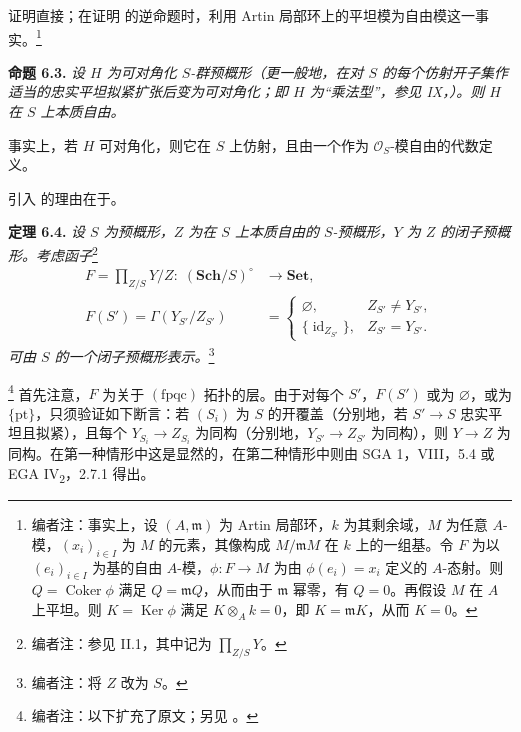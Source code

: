 证明直接；在证明  的逆命题时，利用 Artin 局部环上的平坦模为自由模这一事实。\footnote{编者注：事实上，设 \((A,\mathfrak m)\) 为 Artin 局部环，\(k\) 为其剩余域，\(M\) 为任意 \(A\)-模，\((x_i)_{i\in I}\) 为 \(M\) 的元素，其像构成 \(M/\mathfrak mM\) 在 \(k\) 上的一组基。令 \(F\) 为以 \((e_i)_{i\in I}\) 为基的自由 \(A\)-模，\(\phi:F\to M\) 为由 \(\phi(e_i)=x_i\) 定义的 \(A\)-态射。则 \(Q=\operatorname{Coker}\phi\) 满足 \(Q=\mathfrak mQ\)，从而由于 \(\mathfrak m\) 幂零，有 \(Q=0\)。再假设 \(M\) 在 \(A\) 上平坦。则 \(K=\operatorname{Ker}\phi\) 满足 \(K\otimes_Ak=0\)，即 \(K=\mathfrak mK\)，从而 \(K=0\)。}

\medskip
\noindent{}\textbf{命题 6.3.}
\textit{设 \(H\) 为可对角化 \(S\)-群预概形（更一般地，在对 \(S\) 的每个仿射开子集作适当的忠实平坦拟紧扩张后变为可对角化；即 \(H\) 为“乘法型”，参见 IX，）。则 \(H\) 在 \(S\) 上本质自由。}

事实上，若 \(H\) 可对角化，则它在 \(S\) 上仿射，且由一个作为 \(\mathcal O_S\)-模自由的代数定义。

引入 的理由在于。

\medskip
\noindent{}\textbf{定理 6.4.}
\textit{设 \(S\) 为预概形，\(Z\) 为在 \(S\) 上本质自由的 \(S\)-预概形，\(Y\) 为 \(Z\) 的闭子预概形。考虑函子}\footnote{编者注：参见 II.1，其中记为 \(\prod_{Z/S}Y\)。}
\[
  \begin{aligned}
  F=\prod_{Z/S}Y/Z:\;(\mathbf{Sch}/S)^\circ
    &\longrightarrow\mathbf{Set},\\
  F(S')=\Gamma(Y_{S'}/Z_{S'})
    &=
    \begin{cases}
      \varnothing,& Z_{S'}\ne Y_{S'},\\
      \{\operatorname{id}_{Z_{S'}}\},& Z_{S'}=Y_{S'}.
    \end{cases}
  \end{aligned}
\]
\textit{可由 \(S\) 的一个闭子预概形表示。}\footnote{编者注：将 \(Z\) 改为 \(S\)。}

\smallskip
\noindent\footnote{编者注：以下扩充了原文；另见 。}
首先注意，\(F\) 为关于 \((\mathrm{fpqc})\) 拓扑的层。由于对每个 \(S'\)，\(F(S')\) 或为 \(\varnothing\)，或为 \(\{\mathrm{pt}\}\)，只须验证如下断言：若 \((S_i)\) 为 \(S\) 的开覆盖（分别地，若 \(S'\to S\) 忠实平坦且拟紧），且每个 \(Y_{S_i}\to Z_{S_i}\) 为同构（分别地，\(Y_{S'}\to Z_{S'}\) 为同构），则 \(Y\to Z\) 为同构。在第一种情形中这是显然的，在第二种情形中则由 SGA 1，VIII，5.4 或 EGA IV\textsubscript{2}，2.7.1 得出。

